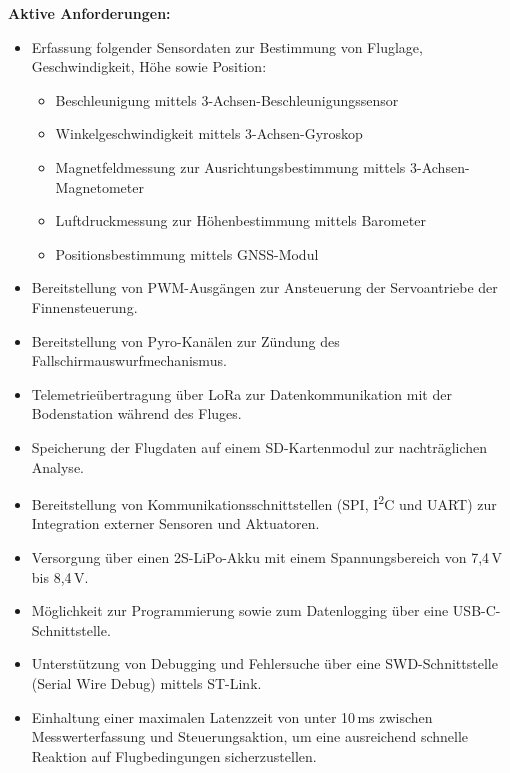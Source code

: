 \textbf{Aktive Anforderungen:}
\begin{itemize}
    \item Erfassung folgender Sensordaten zur Bestimmung von Fluglage, Geschwindigkeit, Höhe sowie Position:
    \begin{itemize}
        \item Beschleunigung mittels 3-Achsen-Beschleunigungssensor
        \item Winkelgeschwindigkeit mittels 3-Achsen-Gyroskop
        \item Magnetfeldmessung zur Ausrichtungsbestimmung mittels 3-Achsen-Magnetometer
        \item Luftdruckmessung zur Höhenbestimmung mittels Barometer
        \item Positionsbestimmung mittels GNSS-Modul
    \end{itemize}
    \item Bereitstellung von PWM-Ausgängen zur Ansteuerung der Servoantriebe der Finnensteuerung.
    \item Bereitstellung von Pyro-Kanälen zur Zündung des Fallschirmauswurfmechanismus.
    \item Telemetrieübertragung über LoRa zur Datenkommunikation mit der Bodenstation während des Fluges.
    \item Speicherung der Flugdaten auf einem SD-Kartenmodul zur nachträglichen Analyse.
    \item Bereitstellung von Kommunikationsschnittstellen (SPI, I\textsuperscript{2}C und UART) zur Integration externer Sensoren und Aktuatoren.
    \item Versorgung über einen 2S-LiPo-Akku mit einem Spannungsbereich von 7,4\,V bis 8,4\,V.
    \item Möglichkeit zur Programmierung sowie zum Datenlogging über eine USB-C-Schnittstelle.
    \item Unterstützung von Debugging und Fehlersuche über eine SWD-Schnittstelle (Serial Wire Debug) mittels ST-Link.
    \item Einhaltung einer maximalen Latenzzeit von unter 10\,ms zwischen Messwerterfassung und Steuerungsaktion, um eine ausreichend schnelle Reaktion auf Flugbedingungen sicherzustellen.
\end{itemize}

\vspace{20pt}

